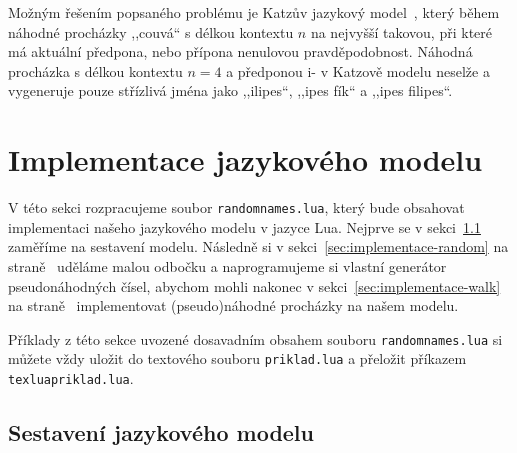 \documentclass{csbulletin}
\newcommand\vref[1]{\ref{#1} na straně~\pageref{#1}}
\begin{document}
Možným řešením popsaného problému je Katzův jazykový model~\cite{katz1987estimation}, který během náhodné procházky ,,couvá`` s délkou kontextu $n$ na nejvyšší takovou, při které má aktuální předpona, nebo přípona nenulovou pravděpodobnost. Náhodná procházka s délkou kontextu $n=4$ a předponou i- v Katzově modelu neselže a vygeneruje pouze střízlivá jména jako ,,ilipes``, ,,ipes fík`` a ,,ipes filipes``.

\section{Implementace jazykového modelu}
\label{sec:implementace}

V této sekci rozpracujeme soubor \texttt{randomnames.lua}, který bude obsahovat implementaci našeho jazykového modelu v jazyce Lua. Nejprve se v sekci~\ref{sec:implementace-model} zaměříme na sestavení modelu. Následně si v sekci~\vref{sec:implementace-random} uděláme malou odbočku a naprogramujeme si vlastní generátor pseudonáhodných čísel, abychom mohli nakonec v sekci~\vref{sec:implementace-walk} implementovat (pseudo)náhodné procházky na našem modelu.

Příklady z této sekce uvozené dosavadním obsahem souboru \texttt{randomnames.lua} si můžete vždy uložit do textového souboru \texttt{priklad.lua} a přeložit příkazem \texttt{texlua\textvisiblespace priklad.lua}.

\subsection{Sestavení jazykového modelu}
\label{sec:implementace-model}
\end{document}
